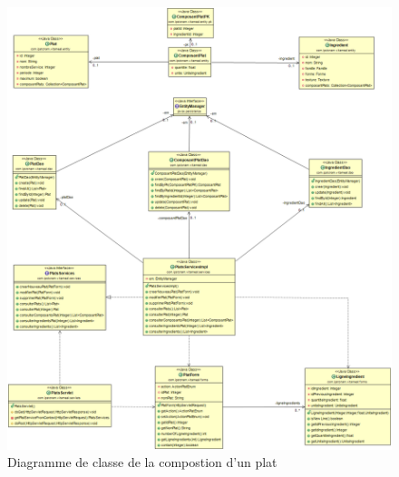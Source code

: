 \begin{figure}
\centering
\includegraphics[scale=0.4]{../../CasDUtilisations/CompositionPlat/classDiagram_ComposerPlat.png}
\caption{Diagramme de classe de la compostion d'un plat}
\label{DiagrammeClassComposerPlat}
\end{figure}
